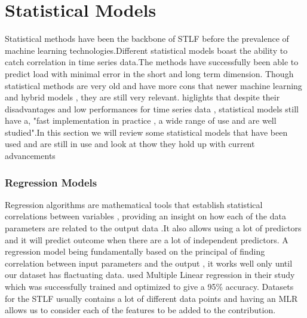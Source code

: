  \section{Statistical Models }
 Statistical methods have been the backbone of STLF before the prevalence of machine learning technologies.Different statistical models boast the ability to catch correlation in time series data.The methods have successfully been able to predict load with minimal error in the short and long term dimension. Though statistical methods are very old and have more cons that newer machine learning and hybrid models  , they are still very relevant. \cite{Rusina2022ShorttermLFH} higlights that despite their disadvantages and low performances for time series data  , statistical models still have a, "fast implementation in practice , a wide range of use and are well studied".In this section we will review some statistical models that have been used and are still in use and look at thow they hold up with current advancements
 
 \subsubsection{Regression Models }

 Regression algorithms are mathematical tools that establish statistical correlations between variables  , providing an insight on how each of the data parameters are related to the output data \cite{gochhait2023regression}.It also allows using a lot of predictors and it will predict outcome when there are a lot of independent predictors. A regression model being fundamentally based on the principal of finding correlation between input parameters and the output \cite{vardhan2023comparative} , it works well only until our dataset has flactuating data. \cite{Dhaval2020ShorttermLFB} used Multiple Linear regression in their study which was successfully trained and optimized to give a 95\% accuracy. Datasets for the STLF usually contains a lot of different data points and having an MLR allows us to consider each of the features to be added to the contribution.
 
